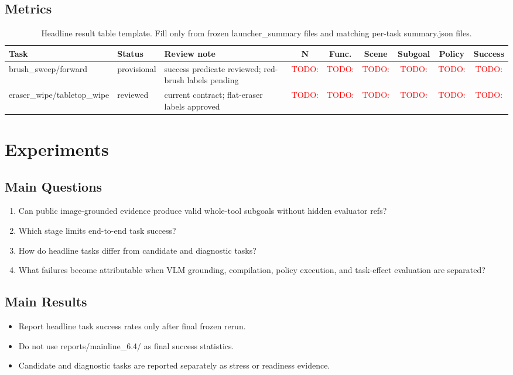 \documentclass[journal]{IEEEtran}
\newcommand{\todo}[1]{\textcolor{red}{TODO: #1}}
\begin{document}
\subsection{Metrics}
\begin{table}[t]
\centering
\caption{Headline result table template. Fill only from frozen
launcher\_summary files and matching per-task summary.json files.}
\scriptsize
\setlength{\tabcolsep}{3pt}
\begin{tabular}{p{}p{}p{}cccccc}
\toprule
Task & Status & Review note & N & Func. & Scene & Subgoal & Policy & Success \\
\midrule
brush\_sweep/forward & provisional & success predicate reviewed; red-brush labels pending & \todo{} & \todo{} & \todo{} & \todo{} & \todo{} & \todo{} \\
eraser\_wipe/tabletop\_wipe & reviewed & current contract; flat-eraser labels approved & \todo{} & \todo{} & \todo{} & \todo{} & \todo{} & \todo{} \\
\bottomrule
\end{tabular}
\end{table}

\section{Experiments}
\subsection{Main Questions}
\begin{enumerate}
  \item Can public image-grounded evidence produce valid whole-tool subgoals
  without hidden evaluator refs?
  \item Which stage limits end-to-end task success?
  \item How do headline tasks differ from candidate and diagnostic tasks?
  \item What failures become attributable when VLM grounding, compilation,
  policy execution, and task-effect evaluation are separated?
\end{enumerate}

\subsection{Main Results}
\begin{itemize}
  \item Report headline task success rates only after final frozen rerun.
  \item Do not use reports/mainline\_6.4/ as final success statistics.
  \item Candidate and diagnostic tasks are reported separately as stress or
  readiness evidence.
\end{itemize}
\end{document}
